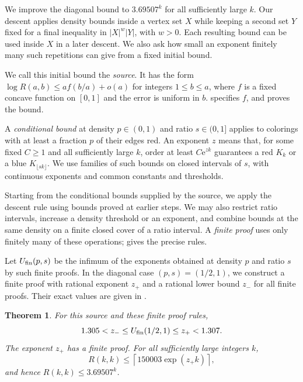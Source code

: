 \documentclass[11pt]{article}
\newtheorem{theorem}{Theorem}
\theoremstyle{definition}
\newcommand{\e}{\mathrm e}
\begin{document}
We improve the diagonal bound to $3.69507^k$ for all sufficiently large $k$.
Our descent applies density bounds inside a vertex set $X$ while keeping a second set $Y$ fixed for a final inequality in $|X|^w|Y|$, with $w>0$.
Each resulting bound can be used inside $X$ in a later descent.
We also ask how small an exponent finitely many such repetitions can give from a fixed initial bound.

We call this initial bound the \emph{source}.
It has the form $\log R(a,b)\le a f(b/a)+o(a)$ for integers $1\le b\le a$, where $f$ is a fixed concave function on $[0,1]$ and the error is uniform in $b$.
 specifies $f$, and  proves the bound.

A \emph{conditional bound} at density $p\in(0,1)$ and ratio $s\in(0,1]$ applies to colorings with at least a fraction $p$ of their edges red.
An exponent $z$ means that, for some fixed $C\ge1$ and all sufficiently large $k$, order at least $C\e^{zk}$ guarantees a red $K_k$ or a blue $K_{\lfloor sk\rfloor}$.
We use families of such bounds on closed intervals of $s$, with continuous exponents and common constants and thresholds.

Starting from the conditional bounds supplied by the source, we apply the descent rule using bounds proved at earlier steps.
We may also restrict ratio intervals, increase a density threshold or an exponent, and combine bounds at the same density on a finite closed cover of a ratio interval.
A \emph{finite proof} uses only finitely many of these operations;  gives the precise rules.

Let $U_{\rm fin}(p,s)$ be the infimum of the exponents obtained at density $p$ and ratio $s$ by such finite proofs.
In the diagonal case $(p,s)=(1/2,1)$, we construct a finite proof with rational exponent $z_+$ and a rational lower bound $z_-$ for all finite proofs.
Their exact values are given in .

\begin{theorem}\label{thm:main}
For this source and these finite proof rules,
\begin{equation}\label{eq:bracket}
 1.305<z_-\le U_{\rm fin}(1/2,1)\le z_+<1.307.
\end{equation}
The exponent $z_+$ has a finite proof.
For all sufficiently large integers $k$,
\begin{equation}\label{eq:main}
 R(k,k)\le\left\lceil150003\exp(z_+k)\right\rceil,
\end{equation}
and hence $R(k,k)\le3.69507^k$.
\end{theorem}
\end{document}
